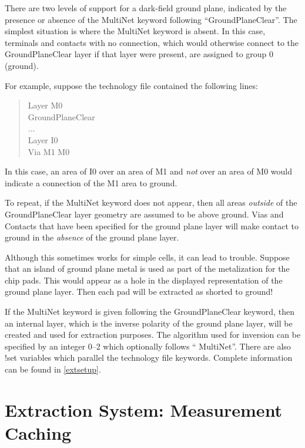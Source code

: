 There are two levels of support for a dark-field ground plane,
indicated by the presence or absence of the {\et MultiNet} keyword
following ``{\vt GroundPlaneClear}''.  The simplest situation is where
the {\et MultiNet} keyword is absent.  In this case, terminals and
contacts with no connection, which would otherwise connect to the {\et
GroundPlaneClear} layer if that layer were present, are assigned to
group 0 (ground).

For example, suppose the technology file contained the following
lines:

\begin{quote}\vt
Layer M0\\
GroundPlaneClear\\
...\\
Layer I0\\
Via M1 M0
\end{quote}

In this case, an area of {\vt I0} over an area of {\vt M1} and {\it
not} over an area of {\vt M0} would indicate a connection of the {\vt
M1} area to ground.

To repeat, if the {\et MultiNet} keyword does not appear, then all
areas {\it outside} of the {\et GroundPlaneClear} layer geometry are
assumed to be above ground.  Vias and Contacts that have been
specified for the ground plane layer will make contact to ground in
the {\it absence} of the ground plane layer.

Although this sometimes works for simple cells, it can lead to
trouble.  Suppose that an island of ground plane metal is used as part
of the metalization for the chip pads.  This would appear as a hole in
the displayed representation of the ground plane layer.  Then each pad
will be extracted as shorted to ground!

If the {\et MultiNet} keyword is given following the {\et
GroundPlaneClear} keyword, then an internal layer, which is the
inverse polarity of the ground plane layer, will be created and used
for extraction purposes.  The algorithm used for inversion can be
specified by an integer 0--2 which optionally follows ``{\vt
MultiNet}''.  There are also {\cb !set} variables which parallel the
technology file keywords.  Complete information can be found in
\ref{extsetup}.


\section{Extraction System: Measurement Caching}
\label{meascache}

